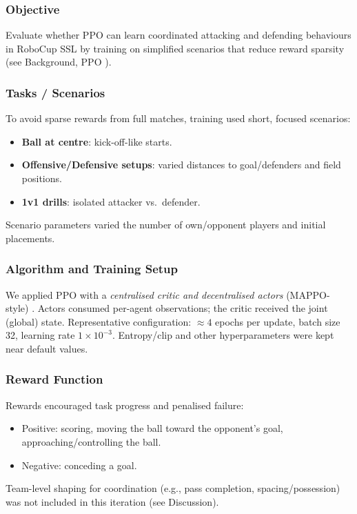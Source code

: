 \subsubsection{Objective}
Evaluate whether PPO can learn coordinated attacking and defending behaviours in RoboCup SSL by training on simplified scenarios that reduce reward sparsity (see Background, PPO \cite{Schulman2017PPO,Yu2021MAPPO}).

\subsubsection{Tasks / Scenarios}
To avoid sparse rewards from full matches, training used short, focused scenarios:
\begin{itemize}
  \item \textbf{Ball at centre}: kick-off-like starts.
  \item \textbf{Offensive/Defensive setups}: varied distances to goal/defenders and field positions.
  \item \textbf{1v1 drills}: isolated attacker vs.\ defender.
\end{itemize}
Scenario parameters varied the number of own/opponent players and initial placements.

\subsubsection{Algorithm and Training Setup}
We applied PPO with a \textit{centralised critic and decentralised actors} (MAPPO-style) \cite{Yu2021MAPPO}. Actors consumed per-agent observations; the critic received the joint (global) state. Representative configuration: \(\approx 4\) epochs per update, batch size 32, learning rate \(1\times10^{-3}\). Entropy/clip and other hyperparameters were kept near default values.

\subsubsection{Reward Function}
Rewards encouraged task progress and penalised failure:
\begin{itemize}
  \item Positive: scoring, moving the ball toward the opponent's goal, approaching/controlling the ball.
  \item Negative: conceding a goal.
\end{itemize}
Team-level shaping for coordination (e.g., pass completion, spacing/possession) was not included in this iteration (see Discussion).


